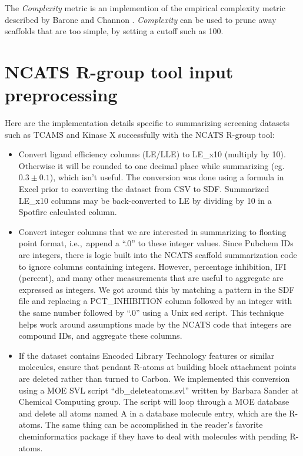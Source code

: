 \documentclass[11pt,letterpaper]{article}
\newcommand*\ie{i.e.,~}
\begin{document}
The \textit{Complexity} metric is an implemention of the empirical
complexity metric described by Barone and Channon \cite{Barone2001}.
\textit{Complexity} can be used to prune away scaffolds that are too
simple, by setting a cutoff such as 100.

\newpage 

\section{NCATS R-group tool input preprocessing}
\label{sec:ncats-prepro}
Here are the implementation details specific to summarizing screening datasets such as TCAMS and Kinase X successfully with the NCATS R-group tool:
\begin{itemize}

\item Convert ligand efficiency columns (LE/LLE) to LE\_x10 (multiply by 10). Otherwise it will be rounded to one decimal place while summarizing (eg. $0.3 \pm  0.1$), which isn't useful. The conversion was done using a formula in Excel prior to converting the dataset from CSV to SDF. Summarized LE\_x10 columns may be back-converted to LE by dividing by 10 in a Spotfire calculated column.  

\item Convert integer columns that we are interested in summarizing to floating point format, \ie append a ``.0'' to these integer values. Since Pubchem IDs are integers, there is logic built into the NCATS scaffold summarization code to ignore columns containing integers. However, percentage inhibition, IFI (percent), and many other measurements that are useful to aggregate are expressed as integers.  We got around this by matching a pattern in the SDF file and replacing a PCT\_INHIBITION column followed by an integer with the same number followed by ``.0'' using a Unix sed script. This technique helps work around assumptions made by the NCATS code that integers are compound IDs, and aggregate these columns.
  
\item If the dataset contains Encoded Library Technology features or similar molecules, ensure that pendant  R-atoms  at building block attachment points are deleted rather than turned to Carbon. We implemented this conversion using a MOE SVL script ``db\_deleteatoms.svl'' written by Barbara Sander at Chemical Computing group. The script will loop through a MOE database and delete all atoms named  A  in a database molecule entry, which are the R-atoms. The same thing can be accomplished in the reader's favorite cheminformatics package if they have to deal with molecules with pending R-atoms.  
\end{itemize}
\end{document}
